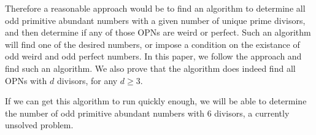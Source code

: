\documentclass[../paper.tex]{article}
\begin{document}
Therefore a reasonable approach would be to find an algorithm to
determine all odd primitive abundant numbers with a given number 
of unique prime divisors, and then determine if any of those OPNs
are weird or perfect. Such an algorithm will find one of the
desired numbers, or impose a condition on the existance of odd
weird and odd perfect numbers. In this paper, we follow the
approach and find such an algorithm. We also prove that the
algorithm does indeed find all OPNs with $d$ divisors, for any $d
\geq 3$.

If we can get this algorithm to run quickly enough, we will be
able to determine the number of odd primitive abundant numbers
with $6$ divisors, a currently unsolved problem\cite{amato}.
\end{document}
